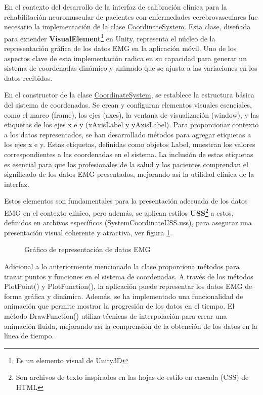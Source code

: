 En el contexto del desarrollo de la interfaz de calibración clínica para la rehabilitación neuromuscular de pacientes con enfermedades cerebrovasculares fue necesario la implementación de la clase \underline{CoordinateSystem}. Esta clase, diseñada para extender \textbf{VisualElement}\footnote{Es un elemento visual de Unity3D } en Unity, representa el núcleo de la representación gráfica de los datos EMG en la aplicación móvil. Uno de los aspectos clave de esta implementación radica en su capacidad para generar un sistema de coordenadas dinámico y animado que se ajusta a las variaciones en los datos recibidos.

\vspace{5pt}
En el constructor de la clase \underline{CoordinateSystem}, se establece la estructura básica del sistema de coordenadas. Se crean y configuran elementos visuales esenciales, como el marco (frame), los ejes (axes), la ventana de visualización (window), y las etiquetas de los ejes x e y (xAxisLabel y yAxisLabel). Para proporcionar contexto a los datos representados, se han desarrollado métodos para agregar etiquetas a los ejes x e y. Estas etiquetas, definidas como objetos Label, muestran los valores correspondientes a las coordenadas en el sistema. La inclusión de estas etiquetas es esencial para que los profesionales de la salud y los pacientes comprendan el significado de los datos EMG presentados, mejorando así la utilidad clínica de la interfaz. 
    
\vspace{5pt}
Estos elementos son fundamentales para la presentación adecuada de los datos EMG en el contexto clínico, pero además, se aplican estilos \textbf{USS}\footnote{Son archivos de texto inspirados en las hojas de estilo en cascada (CSS) de HTML} a estos, definidos en archivos específicos (SystemCoordinateUSS.uss), para asegurar una presentación visual coherente y atractiva, ver figura \ref{fig: graph-emg}.

\begin{figure}[ht]
    \centering
    \caption{Gráfico de representación de datos EMG}
    \label{fig: graph-emg}
\end{figure}

Adicional a lo anteriormente mencionado la clase proporciona métodos para trazar puntos y funciones en el sistema de coordenadas. A través de los métodos PlotPoint() y PlotFunction(), la aplicación puede representar los datos EMG de forma gráfica y dinámica. Además, se ha implementado una funcionalidad de animación que permite mostrar la progresión de los datos en el tiempo. El método DrawFunction() utiliza técnicas de interpolación para crear una animación fluida, mejorando así la comprensión de la obtención de los datos en la línea de tiempo.
